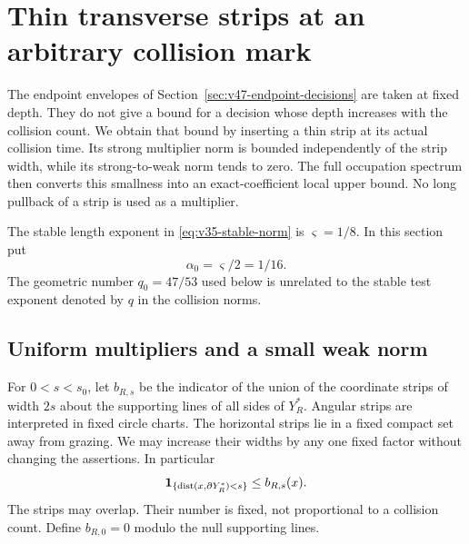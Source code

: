 \section{Thin transverse strips at an arbitrary collision mark}
\label{sec:v48-thin-strips}
The endpoint envelopes of Section~\ref{sec:v47-endpoint-decisions}
are taken at fixed depth. They do not give a bound for a decision whose
depth increases with the collision count. We obtain that bound by
inserting a thin strip at its actual collision time. Its strong
multiplier norm is bounded independently of the strip width, while its
strong-to-weak norm tends to zero. The full occupation spectrum then
converts this smallness into an exact-coefficient local upper bound.
No long pullback of a strip is used as a multiplier.

The stable length exponent in \eqref{eq:v35-stable-norm} is
$\varsigma=1/8$. In this section put
\begin{equation}\label{eq:v48-strip-exponent}
 \alpha_0=\varsigma/2=1/16.
\end{equation}
The geometric number $q_0=47/53$ used below is unrelated to the
stable test exponent denoted by $q$ in the collision norms.

\subsection{Uniform multipliers and a small weak norm}
For $0<s<s_0$, let $b_{R,s}$ be the indicator of the union of the
coordinate strips of width $2s$ about the supporting lines of all
sides of $Y_R^*$. Angular strips are interpreted in fixed circle
charts. The horizontal strips lie in a fixed compact set away from
grazing. We may increase their widths by any one fixed factor without
changing the assertions. In particular
\[
 \mathbf1_{\{\operatorname{dist}(x,\partial Y_R^*)<s\}}\le b_{R,s}(x).
\]
The strips may overlap. Their number is fixed, not proportional to a
collision count. Define $b_{R,0}=0$ modulo the null supporting lines.

